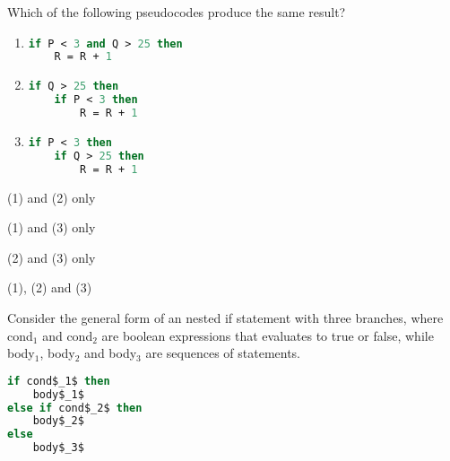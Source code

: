 \begin{questions}
{
}

 Which of the following pseudocodes produce the same result? 

\begin{enumerate}[label=(\arabic*)]
\item 
\begin{lstlisting}[language=Caml]
if P < 3 and Q > 25 then
    R = R + 1
\end{lstlisting}

\item 
\begin{lstlisting}[language=Caml]
if Q > 25 then
    if P < 3 then
        R = R + 1
\end{lstlisting}

\item 
\begin{lstlisting}[language=Caml]
if P < 3 then
    if Q > 25 then
        R = R + 1
\end{lstlisting}
\end{enumerate}

\begin{multiplechoice}
    \item (1) and (2) only
    \item (1) and (3) only
    \item (2) and (3) only
    \item (1), (2) and (3)
\end{multiplechoice}
\label{q:dse:2016p1:q30}


 Consider the general form of an nested if statement with three branches, where cond$_1$ and cond$_2$ are boolean expressions that evaluates to true or false, while body$_1$, body$_2$ and body$_3$ are sequences of statements.

\begin{lstlisting}[language=Caml,mathescape=true]
if cond$_1$ then
    body$_1$
else if cond$_2$ then
    body$_2$
else
    body$_3$
\end{lstlisting}


\end{questions}

